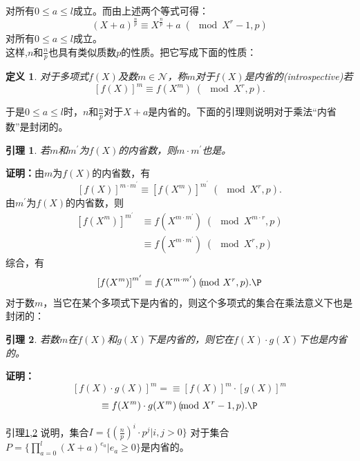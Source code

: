 \documentclass[a4paper]{article}
\newtheorem{lemma}{引理}[section]
\newtheorem{definition}{定义}[section]
\numberwithin{equation}{section}
\begin{document}
\begin{multicols}{2}
\begin{equation}
  \end{equation}
  对所有$0\le a\le \mathit{l}$成立。而由上述两个等式可得：
  \begin{equation}
    (X+a)^{\frac{n}{p}}\equiv X^{\frac{n}{p}}+a\;(\!\!\!\!\!\mod{X^r-1,p})
  \end{equation}
  对所有$0\le a\le \mathit{l}$成立。\\
  这样,$n$和$\frac{n}{p}$也具有类似质数$p$的性质。把它写成下面的性质：
  \begin{definition}
    \upshape 对于多项式$f(X)$及数$m\in\mathcal{N}$，称$m$对于$f(X)$是内省的(introspective)若
    \[\left[f(X)\right]^m\equiv f(X^m)\;(\!\!\!\!\!\mod{X^r,p}).\]
  \end{definition}
  于是$0\le a\le \mathit{l}$时，$n$和$\frac{n}{p}$对于$X+a$是内省的。下面的引理则说明对于乘法``内省数''是封闭的。
  \begin{lemma}\label{introspectiveN}
    \upshape 若$m$和$m^\prime$为$f(X)$的内省数，则$m\cdot m^\prime$也是。
  \end{lemma}
  \textbf{证明：}由$m$为$f(X)$的内省数，有
  \begin{equation}
    \left[f(X)\right]^{m\cdot m^\prime}\equiv\left[f(X^m)\right]^{m^\prime}\;(\!\!\!\!\!\mod{X^r,p}).
  \end{equation}
  由$m^\prime$为$f(X)$的内省数，则
  \begin{equation}
    \begin{split}
      \left[f(X^m)\right]^{m^\prime}&\equiv  f(X^{m\cdot m^\prime})\;(\!\!\!\!\!\mod{X^{m\cdot r},p})\\
      & \equiv f(X^{m\cdot m^\prime})\; (\!\!\!\!\!\mod{X^r,p})
    \end{split}
  \end{equation}
  综合，有
  \begin{equation}
    \left[f(X^m)\right]^{m^\prime}\equiv f(X^{m\cdot m^\prime})\;
    (\!\!\!\!\!\mod{X^r,p}).\P
  \end{equation}
  对于数$m$，当它在某个多项式下是内省的，则这个多项式的集合在乘法意义下也是封闭的：
  \begin{lemma}\label{introspectiveP}
    \upshape 若数$m$在$f(X)$和$g(X)$下是内省的，则它在$f(X)\cdot g(X)$下也是内省的。
  \end{lemma}
  \textbf{证明：}\[\left[f(X)\cdot g(X)\right]^m=\equiv\left[f(X)\right]^m\cdot\left[g(X)\right]^m\]
  \[\equiv f(X^m)\cdot g(X^m)\:(\!\!\!\!\!\mod{X^r-1,p}).\P\]

  引理\ref{introspectiveN},\ref{introspectiveP} 说明，集合$I=\{\left(\frac{n}{p}\right)^i\cdot p^j|i,j>0\}$
  对于集合$P=\{\prod_{a=0}^\mathit{l}\left(X+a\right)^{e_a}|e_a\ge 0\}$是内省的。\\[0.2cm]


\end{multicols}
\end{document}
